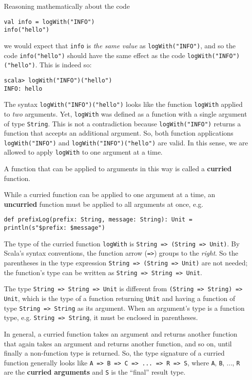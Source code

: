 Reasoning mathematically about the code
\begin{lstlisting}
val info = logWith("INFO")
info("hello")
\end{lstlisting}
we would expect that \lstinline!info! is \emph{the same value} as
\lstinline!logWith("INFO")!, and so the code \lstinline!info("hello")!
should have the same effect as the code \lstinline!logWith("INFO")("hello")!.
This is indeed so:
\begin{lstlisting}
scala> logWith("INFO")("hello")
INFO: hello
\end{lstlisting}
The syntax \lstinline!logWith("INFO")("hello")! looks like the function
\lstinline!logWith! applied to \emph{two} arguments. Yet, \lstinline!logWith!
was defined as a function with a single argument of type \lstinline!String!.
This is not a contradiction because \lstinline!logWith("INFO")! returns
a function that accepts an additional argument. So, both function
applications \lstinline!logWith("INFO")! and \lstinline!logWith("INFO")("hello")!
are valid. In this sense, we are allowed to apply \lstinline!logWith!
to one argument at a time.

A function that can be applied to arguments in this way is called
a \textbf{curried} function. 

While a curried function can be applied to one argument at a time,
an \textbf{uncurried} function must be
applied to all arguments at once, e.g.
\begin{lstlisting}
def prefixLog(prefix: String, message: String): Unit = println(s"$prefix: $message")
\end{lstlisting}

The type of the curried function \lstinline!logWith! is \lstinline!String => (String => Unit)!.
By Scala's syntax conventions, the function arrow (\lstinline!=>!)
groups to the \emph{right}. So the parentheses in the type expression
\lstinline!String => (String => Unit)! are not needed; the function's
type can be written as \lstinline!String => String => Unit!.

The type \lstinline!String => String => Unit! is different from \lstinline!(String => String) => Unit!,
which is the type of a function returning \lstinline!Unit! and having
a function of type \lstinline!String => String! as its argument.
When an argument's type is a function type, e.g. \lstinline!String => String!,
it must be enclosed in parentheses.

In general, a curried function takes an argument and returns another
function that again takes an argument and returns another function,
and so on, until finally a non-function type is returned. So, the
type signature of a curried function generally looks like \lstinline!A => B => C => ... => R => S!,
where \lstinline!A!, \lstinline!B!, ..., \lstinline!R! are the
\textbf{curried arguments} and \lstinline!S!
is the ``final'' result type.

